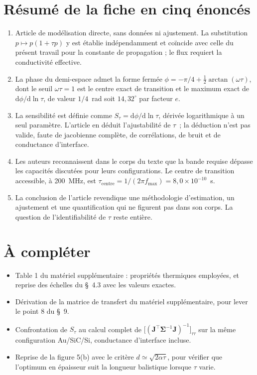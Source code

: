 \documentclass[11pt,a4paper]{article}
\newcommand{\sep}{\par\medskip\noindent{\color{filet}\rule{\linewidth}{0.6pt}}\par\medskip}
\begin{document}
\section{Résumé de la fiche en cinq énoncés}

\begin{enumerate}[leftmargin=1.7em,itemsep=4pt,topsep=2pt]
\item Article de modélisation directe, sans données ni ajustement. La substitution
      $p \mapsto p(1+\tau p)$ y est établie indépendamment et coïncide avec celle du présent
      travail pour la constante de propagation ; le flux requiert la conductivité effective.
\item La phase du demi-espace admet la forme fermée
      $\phi = -\pi/4 + \tfrac12\arctan(\omega\tau)$, dont le seuil $\omega\tau = 1$ est le
      centre exact de transition et le maximum exact de $\mathrm{d}\phi/\mathrm{d}\ln\tau$, de
      valeur $1/4$~rad soit $14{,}32^\circ$ par facteur $e$.
\item La sensibilité est définie comme $S_\tau = \mathrm{d}\phi/\mathrm{d}\ln\tau$, dérivée
      logarithmique à un seul paramètre. L'article en déduit l'ajustabilité de $\tau$~; la
      déduction n'est pas valide, faute de jacobienne complète, de corrélations, de bruit et de
      conductance d'interface.
\item Les auteurs reconnaissent dans le corps du texte que la bande requise dépasse les
      capacités discutées pour leurs configurations. Le centre de transition accessible, à
      200~MHz, est $\tau_{\mathrm{centre}} = 1/(2\pi f_{\max}) = 8{,}0\times10^{-10}$~s.
\item La conclusion de l'article revendique une méthodologie d'estimation, un ajustement et une
      quantification qui ne figurent pas dans son corps. La question de l'identifiabilité de
      $\tau$ reste entière.
\end{enumerate}

\sep

\section*{À compléter}

\begin{itemize}[leftmargin=1.2em,itemsep=2pt,topsep=2pt]
\item Table 1 du matériel supplémentaire : propriétés thermiques employées, et reprise des
      échelles du §~4.3 avec les valeurs exactes.
\item Dérivation de la matrice de transfert du matériel supplémentaire, pour lever le point 8
      du §~9.
\item Confrontation de $S_\tau$ au calcul complet de
      $\big[(\mathbf J^{\!\top}\boldsymbol\Sigma^{-1}\mathbf J)^{-1}\big]_{\tau\tau}$ sur la même
      configuration Au/SiC/Si, conductance d'interface incluse.
\item Reprise de la figure 5(b) avec le critère $d \simeq \sqrt{2\alpha\tau}$, pour vérifier que
      l'optimum en épaisseur suit la longueur balistique lorsque $\tau$ varie.
\end{itemize}
\end{document}
